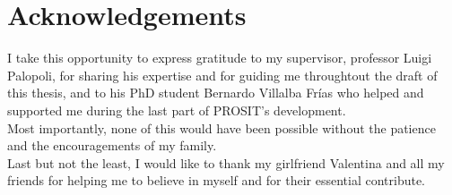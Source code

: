 \chapter{Acknowledgements}\label{chp:acknowledgements}

I take this opportunity to express gratitude to my supervisor, professor Luigi Palopoli, for sharing his expertise and for guiding me throughtout the draft of this thesis, and to his PhD student Bernardo Villalba Frías who helped and supported me during the last part of PROSIT's development.\\
Most importantly, none of this would have been possible without the patience and the encouragements of my family.\\
Last but not the least, I would like to thank my girlfriend Valentina and all my friends for helping me to believe in myself and for their essential contribute.